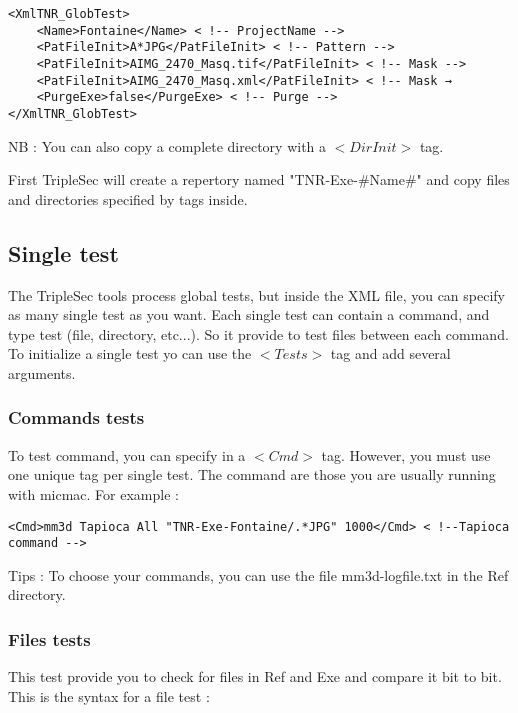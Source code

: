 \documentclass[a4paper]{book}
\begin{document}
\begin{lstlisting}
<XmlTNR_GlobTest>
	<Name>Fontaine</Name> < !-- ProjectName -->
	<PatFileInit>A*JPG</PatFileInit> < !-- Pattern -->
	<PatFileInit>AIMG_2470_Masq.tif</PatFileInit> < !-- Mask -->
	<PatFileInit>AIMG_2470_Masq.xml</PatFileInit> < !-- Mask →
	<PurgeExe>false</PurgeExe> < !-- Purge -->
</XmlTNR_GlobTest>
\end{lstlisting}

NB : You can also copy a complete directory with a $<DirInit>$ tag.

First TripleSec will create a repertory named "TNR-Exe-\#Name\#" and copy files and directories specified by tags inside.

\subsection{Single test}
The TripleSec tools process global tests, but inside the XML file, you can specify as many single test as you want. Each single test can contain a command, and type test (file, directory, etc...). So it provide to test files between each command. To initialize a single test yo can use the $<Tests>$ tag and add several arguments.

\subsubsection{Commands tests}
To test command, you can specify in a $<Cmd>$ tag. However, you must use one unique tag per single test. The command are those you are usually running with micmac. For example :

\begin{lstlisting}
<Cmd>mm3d Tapioca All "TNR-Exe-Fontaine/.*JPG" 1000</Cmd> < !--Tapioca command -->
\end{lstlisting}

Tips : To choose your commands, you can use the file mm3d-logfile.txt in the Ref directory.

\subsubsection{Files tests}
This test provide you to check for files in Ref and Exe and compare it bit to bit. This is the syntax for a file test :
\end{document}
